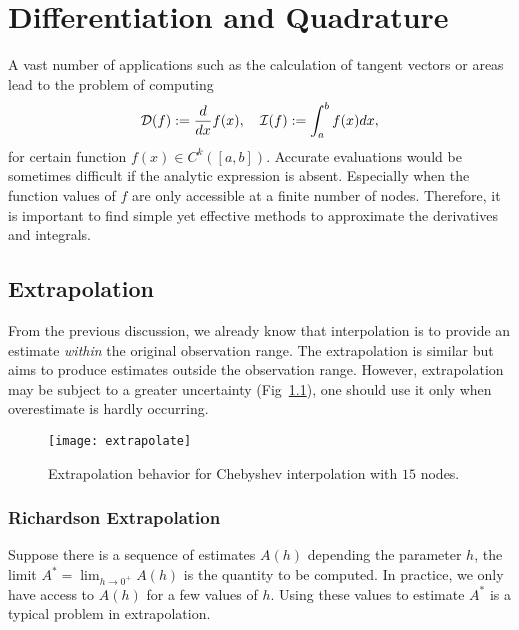 \chapter{Differentiation and Quadrature}
\label{Ch: 3-Dif-Qua}
A vast number of applications such as the calculation of tangent vectors or areas lead to the problem of computing 
\begin{equation}
    \mathcal D(f) := \frac{d}{dx} f(x),\quad \mathcal I(f) := \int_a^b f(x) dx, 
\end{equation}
for certain function $f(x)\in C^k([a, b])$. Accurate evaluations would be sometimes difficult if the analytic expression is absent. Especially when the function values of $f$ are only accessible at a finite number of nodes. Therefore, it is important to find simple yet effective methods to approximate the derivatives and integrals. 

\section{Extrapolation}
\label{Sec: 2-Ext}
From the previous discussion, we already know that interpolation is to provide an estimate \emph{within} the original observation range. The extrapolation is similar but aims to produce estimates outside the observation range. However, extrapolation may be subject to a greater uncertainty (Fig~\ref{FIG: EXTRAPO}), one should use it only when overestimate is hardly occurring.
\begin{figure}[!htb]
    \centering
    \texttt{[image: extrapolate]}
    \caption{Extrapolation behavior for Chebyshev interpolation with $15$ nodes.}
    \label{FIG: EXTRAPO}
\end{figure}

\subsection{Richardson Extrapolation}
\label{SSec: 3-Ric-Ext}
Suppose there is a sequence of estimates $A(h)$ depending the parameter $h$, the limit $A^{\ast} = \lim_{h\to 0^{+}} A(h)$ is the quantity to be computed. In practice, we only have access to $A(h)$ for a few values of $h$. Using these values to estimate $A^{\ast}$ is a typical problem in extrapolation. 

